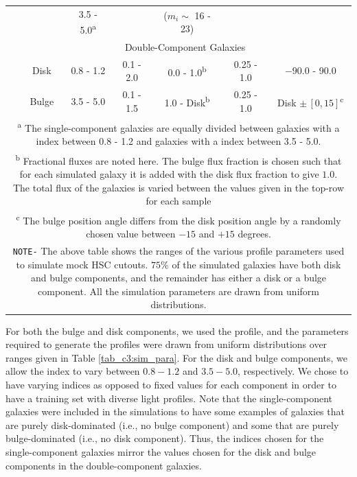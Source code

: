 \begin{table}[htbp]
\begin{tabular}{c|cccccc}
        & & 3.5 - 5.0\textsuperscript{a}& & ($m_i \sim $ 16 - 23) & & \\
        \cline{2-7}
        & \multicolumn{6}{c}{Double-Component Galaxies} \\
        & Disk & 0.8 - 1.2 & 0.1 - 2.0 & 0.0 - 1.0\textsuperscript{b} & 0.25 - 1.0 & $-90.0$ - 90.0\\
        & Bulge & 3.5 - 5.0 & 0.1 - 1.5 & 1.0 - Disk\textsuperscript{b} & 0.25 - 1.0 &  Disk $\pm\,[0,15]$\textsuperscript{c} \\
        \hline
        \multicolumn{7}{p{0.95\textwidth}}{\vskip 0.01cm \small \textsuperscript{a} The single-component galaxies are equally divided between galaxies with a \sersic{} index between 0.8 - 1.2 and galaxies with a \sersic{} index between 3.5 - 5.0.} \\
        \multicolumn{7}{p{0.95\textwidth}}{\small \textsuperscript{b} Fractional fluxes are noted here. The bulge flux fraction is chosen such that for each simulated galaxy it is added with the disk flux fraction to give $1.0$. The total flux of the galaxies is varied between the values given in the top-row for each sample} \\
        \multicolumn{7}{p{0.95\textwidth}}{\small \textsuperscript{c} The bulge position angle differs from the disk position angle by a randomly chosen value between $-15$ and $+15$ degrees.} \\
        \multicolumn{7}{p{0.95\textwidth}}{\small \texttt{NOTE-} The above table shows the ranges of the various \sersic{} profile parameters used to simulate mock HSC cutouts. $75\%$ of the simulated galaxies have both disk and bulge components, and the remainder has either a disk or a bulge component. All the simulation parameters are drawn from uniform distributions.} \\
    \end{tabular}
    \end{table}

For both the bulge and disk components, we used the \sersic{} profile, and the parameters required to generate the \sersic{} profiles were drawn from uniform distributions over ranges given in Table \ref{tab_c3:sim_para}. For the disk and bulge components, we allow the \sersic{} index to vary between $0.8-1.2$ and $3.5-5.0$, respectively. We chose to have varying \sersic{} indices as opposed to fixed values for each component in order to have a training set with diverse light profiles. Note that the single-component galaxies were included in the simulations to have some examples of galaxies that are purely disk-dominated (i.e., no bulge component) and some that are purely bulge-dominated (i.e., no disk component). Thus, the \sersic{} indices chosen for the single-component galaxies mirror the values chosen for the disk and bulge components in the double-component galaxies.


